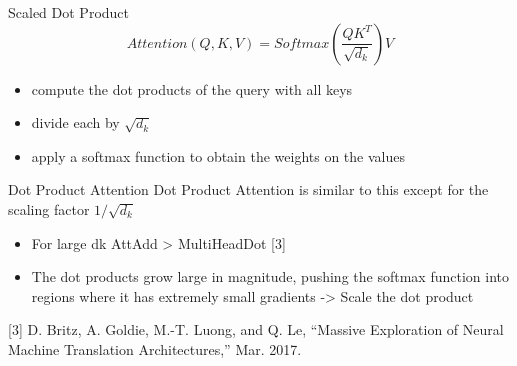 \documentclass{beamer}
\begin{document}
\begin{frame}[fragile]{Scaled Dot Product}
	$$Attention(Q,K,V) = Softmax(\dfrac{QK^T}{\sqrt{d_k}}) V$$
	\begin{itemize}
		\item compute the dot products of the query with all keys
		\item divide each by $\sqrt{d_k}$
		\item apply a softmax function to obtain the weights on the values
	\end{itemize}
	
	\begin{block}{Dot Product Attention}
		Dot Product Attention is similar to this except for the scaling factor $1 / \sqrt{d_k}$
	\end{block}
	
	\begin{itemize}
		\item For large dk AttAdd > MultiHeadDot [3]
		\item The dot products grow large in magnitude, pushing the softmax function into regions where it has extremely small gradients -> Scale the dot product
	\end{itemize}
[3] D. Britz, A. Goldie, M.-T. Luong, and Q. Le, “Massive Exploration of Neural Machine Translation Architectures,” Mar. 2017.
\end{frame}
\end{document}
